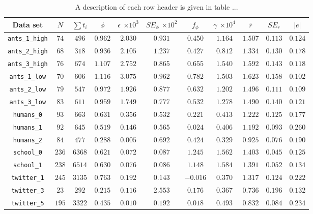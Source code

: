 \documentclass[10pt]{article}
\begin{document}
\begin{multicols}{2}
\begin{table*}[t]
\caption{A description of each row header is given in table ...}
\label{results}
\centering
\begin{tabular}{c|cccccccccc}
\toprule
Data set & $N$  & $\sum t_{i}$ & $\phi$ & $\epsilon$ \small{$\times 10^{3}$} & $SE_{\phi}$ \small{$\times 10^{2}$} & $f_{\phi}$ & $\gamma $ \small{$\times 10^{4}$} & $\bar{r}$ & $SE_{r}$ & $|e|$\\
\midrule
\verb|ants_1_high| & $74$  & $496$ & $0.962$ & $2.030$ & $0.931$ & $0.450$ & $1.164$ & $1.507$ & $0.113$ & $0.124$\\
\verb|ants_2_high| & $68$  & $318$ & $0.936$ & $2.105$ & $1.237$ & $0.427$ & $0.812$ & $1.334$ & $0.130$ & $0.178$\\
\verb|ants_3_high| & $76$  & $674$ & $1.107$ & $2.752$ & $0.865$ & $0.655$ & $1.540$ & $1.592$ & $0.143$ & $0.118$\\
\verb|ants_1_low| & $70$  & $606$ & $1.116$ & $3.075$ & $0.962$ & $0.782$ & $1.503$ & $1.623$ & $0.158$ & $0.102$\\
\verb|ants_2_low| & $79$  & $547$ & $0.972$ & $1.926$ & $0.877$ & $0.632$ & $1.202$ & $1.496$ & $0.111$ & $0.109$\\
\verb|ants_3_low| & $83$  & $611$ & $0.959$ & $1.749$ & $0.777$ & $0.532$ & $1.278$ & $1.490$ & $0.140$ & $0.121$\\
\verb|humans_0| & $93$  & $663$ & $0.631$ & $0.356$ & $0.532$ & $0.221$ & $0.413$ & $1.222$ & $0.125$ & $0.177$\\
\verb|humans_1| & $92$  & $645$ & $0.519$ & $0.146$ & $0.565$ & $0.024$ & $0.406$ & $1.192$ & $0.093$ & $0.260$\\
\verb|humans_2| & $84$  & $477$ & $0.288$ & $0.005$ & $0.692$ & $0.424$ & $0.329$ & $0.925$ & $0.076$ & $0.190$\\
\verb|school_0| & $236$  & $6368$ & $0.621$ & $0.072$ & $0.087$ & $1.245$ & $1.562$ & $1.403$ & $0.045$ & $0.125$\\
\verb|school_1| & $238$  & $6514$ & $0.630$ & $0.076$ & $0.086$ & $1.148$ & $1.584$ & $1.391$ & $0.052$ & $0.134$\\
\verb|twitter_1| & $245$ & $3135$ & $0.763$ & $0.192$ & $0.143$ & $-0.016$ & $0.370$ & $1.317$ & $0.124$ & $0.222$\\
\verb|twitter_3| & $23$  & $292$ & $0.215$ & $0.116$ & $2.553$ & $0.176$ & $0.367$ & $0.736$ & $0.196$ & $0.132$\\
\verb|twitter_5| & $195$ & $3322$ & $0.435$ & $0.010$ & $0.192$ & $0.018$ & $0.493$ & $0.832$ & $0.084$ & $0.234$\\

\end{tabular}
\end{table*}
\end{multicols}
\end{document}
